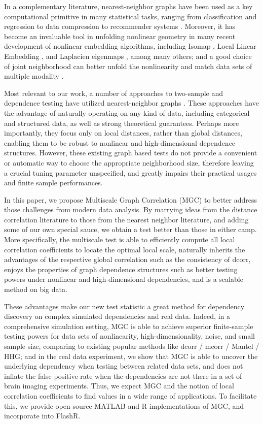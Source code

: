 \documentclass[11pt]{article}
\begin{document}
In a complementary literature, nearest-neighbor graphs have been used as a key computational primitive in many statistical tasks, ranging from classification and regression \cite{Stone1977} to data compression to recommender systems \cite{Sarwar2000}. Moreover, it has become an invaluable tool in unfolding nonlinear geometry in many recent development of nonlinear embedding algorithms, including Isomap \cite{TenenbaumSilvaLangford2000, SilvaTenenbaum2003}, Local Linear Embedding \cite{SaulRoweis2000, RoweisSaul2003}, and Laplacien eigenmaps \cite{BelkinNiyogi2003}, among many others; and a good choice of joint neighborhood can better unfold the nonlinearity and match data sets of multiple modality \cite{ShenVogelsteinPriebe2016}.

Most relevant to our work, a number of approaches to two-sample and dependence testing have utilized nearest-neighbor graphs \cite{David1966,Friedman1983,Schilling1986,Dumcke2014}.  These approaches have the advantage of naturally operating on any kind of data, including categorical and structured data, as well as strong theoretical guarantees.  Perhaps more importantly, they focus only on local distances, rather than global distances, enabling them to be robust to nonlinear and high-dimensional dependence structures.  However, these existing graph based tests do not provide a convenient or automatic way to choose the appropriate neighborhood size, therefore leaving a crucial tuning parameter unspecified, and greatly impairs their practical usages and finite sample performances. 

In this paper, we propose Multiscale Graph Correlation (MGC) to better address those challenges from modern data analysis. By marrying ideas from the distance correlation literature to those from the nearest neighbor literature, and adding some of our own special sauce, we obtain a test better than those in either camp.  More specifically,  the multiscale test is able to efficiently compute all local correlation coefficients to locate the optimal local scale, naturally inherits the advantages of the respective global correlation such as the consistency of dcorr, enjoys the properties of graph dependence structures such as better testing powers under nonlinear and high-dimensional dependencies, and is a scalable method on big data. 

These advantages make our new test statistic a great method for dependency discovery on complex simulated dependencies and real data. Indeed, in a comprehensive simulation setting, MGC is able to achieve superior finite-sample testing powers for data sets of nonlinearity, high-dimensionality, noise, and small sample size, comparing to existing popular methods like dcorr / mcorr / Mantel / HHG; and in the real data experiment, we show that MGC is able to uncover the underlying dependency when testing between related data sets,  and does not inflate the false positive rate when the dependencies are not there in a set of brain imaging experiments. Thus, we expect MGC and the notion of local correlation coefficients to find values in a wide range of applications.  To facilitate this, we provide open source MATLAB and R implementations of MGC, and incorporate into FlashR.
\end{document}
